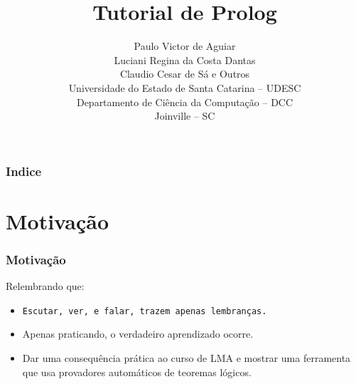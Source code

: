 \documentclass[sans]{beamer}
\title[Tutorial de Prolog]{Tutorial de Prolog}
\author[Paulo, Claudio, Lu]{Paulo Victor de Aguiar\\
	Luciani Regina da Costa Dantas\\
	Claudio Cesar de Sá e Outros\\ 
	Universidade do Estado de Santa Catarina -- UDESC\\
	Departamento de Ciência da Computação -- DCC\\
	Joinville -- SC}
\begin{document}
\begin{frame}[fragile]   %
\maketitle
\end{frame}


\begin{frame}[fragile]   %
\frametitle{Indice}

\tableofcontents
\end{frame}



\section{Motivação}

\begin{frame}[fragile]   %
\frametitle{Motivação}
\begin{block}{Relembrando que:}
\begin{itemize}

\itemsep 17pt

\item  \texttt{Escutar, ver, e falar, trazem apenas lembranças.}

  \item  Apenas praticando, o verdadeiro
aprendizado ocorre.

  \item Dar uma consequência prática ao curso de LMA
e mostrar uma ferramenta que usa provadores automáticos
de teoremas lógicos.

\end{itemize}  
\end{block}   
\end{frame}
\end{document}
